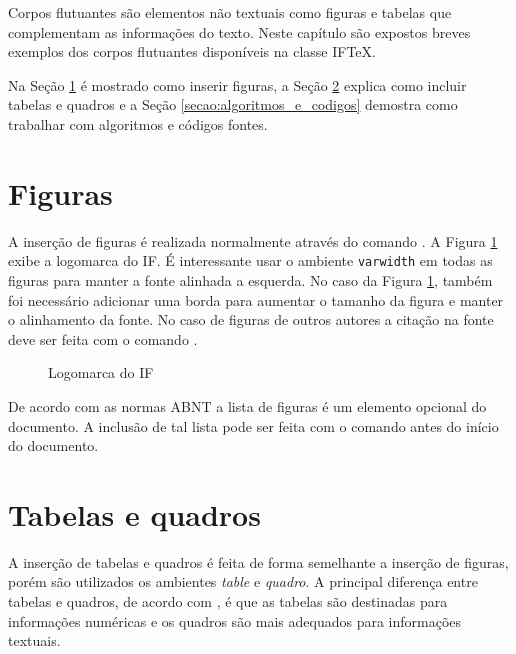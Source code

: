Corpos flutuantes são elementos não textuais como figuras e tabelas que complementam as informações do texto. Neste capítulo são expostos breves exemplos dos corpos flutuantes disponíveis na classe {IF\TeX}.

Na Seção \ref{secao:figuras} é mostrado como inserir figuras, a Seção \ref{secao:tabelas_e_quadros} explica como incluir tabelas e quadros e a Seção \ref{secao:algoritmos_e_codigos} demostra como trabalhar com algoritmos e códigos fontes.

\section{Figuras}
\label{secao:figuras}

A inserção de figuras é realizada normalmente através do comando .
A Figura \ref{figura:logomarca_if} exibe a logomarca do IF.
É interessante usar o ambiente \texttt{varwidth} em todas as figuras para manter a fonte alinhada a esquerda.
No caso da Figura \ref{figura:logomarca_if}, também foi necessário adicionar uma borda para aumentar o tamanho da figura e manter o alinhamento da fonte.
No caso de figuras de outros autores a citação na fonte deve ser feita com o comando .

\begin{figure}[!htb] \centering
\caption{Logomarca do IF} \label{figura:logomarca_if}
\begin{varwidth}{\linewidth}
 \framebox[0.8\linewidth]{
   
 }
\end{varwidth}
\end{figure}

De acordo com as normas ABNT a lista de figuras é um elemento opcional do documento.
A inclusão de tal lista pode ser feita com o comando  antes do início do documento.

\section{Tabelas e quadros}
\label{secao:tabelas_e_quadros}

A inserção de tabelas e quadros é feita de forma semelhante a inserção de figuras, porém são utilizados os ambientes \textit{table} e \textit{quadro}. A principal diferença entre tabelas e quadros, de acordo com \citet{ifmg:2020:manual}, é que as tabelas são destinadas para informações numéricas e os quadros são mais adequados para informações textuais.

